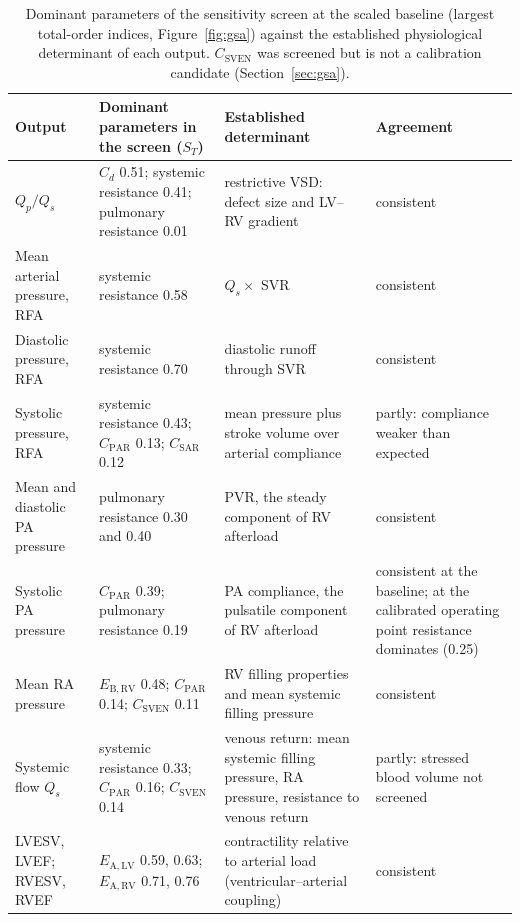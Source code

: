 \documentclass{article}
\begin{document}
\begin{table}[!htbp]
\centering\small
\setlength{\tabcolsep}{3pt}
\caption{Dominant parameters of the sensitivity screen at the scaled baseline (largest total-order indices, Figure~\ref{fig:gsa}) against the established physiological determinant of each output. $C_{\mathrm{SVEN}}$ was screened but is not a calibration candidate (Section~\ref{sec:gsa}).}
\label{tab:physio_gsa}
\footnotesize
\begin{tabularx}{\linewidth}{>{\raggedright\arraybackslash}p{2.2cm} >{\raggedright\arraybackslash}X >{\raggedright\arraybackslash}X >{\raggedright\arraybackslash}p{2.2cm}}
\toprule
\textbf{Output} & \textbf{Dominant parameters in the screen ($S_T$)} & \textbf{Established determinant} & \textbf{Agreement} \\
\midrule
$Q_p/Q_s$ & $C_d$ 0.51; systemic resistance 0.41; pulmonary resistance 0.01 & restrictive VSD: defect size and LV--RV gradient~\cite{Rao2024,Haas_2024} & consistent \\
Mean arterial pressure, RFA & systemic resistance 0.58 & $Q_s \times$ SVR & consistent \\
Diastolic pressure, RFA & systemic resistance 0.70 & diastolic runoff through SVR & consistent \\
Systolic pressure, RFA & systemic resistance 0.43; $C_{\mathrm{PAR}}$ 0.13; $C_{\mathrm{SAR}}$ 0.12 & mean pressure plus stroke volume over arterial compliance~\cite{FloresGeronimo2021} & partly: compliance weaker than expected \\
Mean and diastolic PA pressure & pulmonary resistance 0.30 and 0.40 & PVR, the steady component of RV afterload~\cite{Kempton2025,Gouwy2025} & consistent \\
Systolic PA pressure & $C_{\mathrm{PAR}}$ 0.39; pulmonary resistance 0.19 & PA compliance, the pulsatile component of RV afterload~\cite{Kempton2025,Gouwy2025} & consistent at the baseline; at the calibrated operating point resistance dominates (0.25) \\
Mean RA pressure & $E_{\mathrm{B,RV}}$ 0.48; $C_{\mathrm{PAR}}$ 0.14; $C_{\mathrm{SVEN}}$ 0.11 & RV filling properties and mean systemic filling pressure~\cite{Persichini2022} & consistent \\
Systemic flow $Q_s$ & systemic resistance 0.33; $C_{\mathrm{PAR}}$ 0.16; $C_{\mathrm{SVEN}}$ 0.14 & venous return: mean systemic filling pressure, RA pressure, resistance to venous return~\cite{Persichini2022} & partly: stressed blood volume not screened \\
LVESV, LVEF; RVESV, RVEF & $E_{\mathrm{A,LV}}$ 0.59, 0.63; $E_{\mathrm{A,RV}}$ 0.71, 0.76 & contractility relative to arterial load (ventricular--arterial coupling)~\cite{Vriz2021} & consistent \\
\bottomrule
\end{tabularx}
\end{table}
\end{document}
